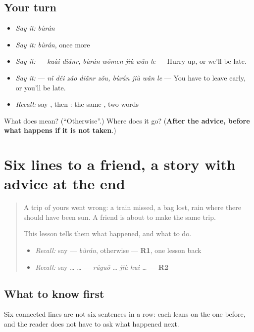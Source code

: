 \subsection*{Your turn}
\begin{itemize}
\raggedright
  \item \emph{Say it:} \emph{bùrán}
  \item \emph{Say it:} \emph{bùrán}, once more
  \item \emph{Say it:}   — \emph{kuài diǎnr, bùrán wǒmen jiù wǎn le} — Hurry up, or we'll be late.
  \item \emph{Say it:}   — \emph{nǐ děi zǎo diǎnr zǒu, bùrán jiù wǎn le} — You have to leave early, or you'll be late.
  \item \emph{Recall:} say , then : the same , two words
\end{itemize}

\begin{tcolorbox}[breakable,colback=teal!4,colframe=teal!35!black,title={Before you move on}]
What does  mean? (\textquotedblleft{}Otherwise\textquotedblright{}.) Where does it go? (\textbf{After the advice, before what happens if it is not taken}.)
\end{tcolorbox}
\section[(six lines)]{Six lines to a friend, a story with advice at the end}

\label{lesson:ZH-W289-six-lines}



\begin{quote}
A trip of yours went wrong: a train missed, a bag lost, rain where there should have been sun. A friend is about to make the same trip.

This lesson tells them what happened, and what to do.

\begin{itemize}
\raggedright
  \item \emph{Recall:} say  — \emph{bùrán}, otherwise — \textbf{R1}, one lesson back
  \item \emph{Recall:} say  …  … — \emph{rúguǒ … jiù huì …} — \textbf{R2}
\end{itemize}
\end{quote}

\subsection*{What to know first}
Six connected lines are not six sentences in a row: each leans on the one before, and the reader does not have to ask what happened next.


